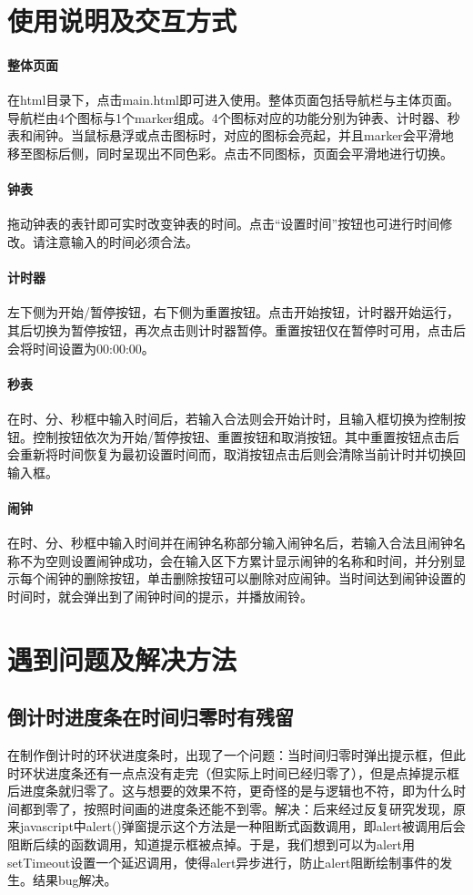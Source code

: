 \documentclass[UTF8]{ctexart}
\begin{document}
	
	\section{使用说明及交互方式} %
	\paragraph{整体页面}
	在html目录下，点击main.html即可进入使用。整体页面包括导航栏与主体页面。导航栏由4个图标与1个marker组成。4个图标对应的功能分别为钟表、计时器、秒表和闹钟。当鼠标悬浮或点击图标时，对应的图标会亮起，并且marker会平滑地移至图标后侧，同时呈现出不同色彩。点击不同图标，页面会平滑地进行切换。
	\paragraph{钟表}
	拖动钟表的表针即可实时改变钟表的时间。点击“设置时间”按钮也可进行时间修改。请注意输入的时间必须合法。
	\paragraph{计时器}
	左下侧为开始/暂停按钮，右下侧为重置按钮。点击开始按钮，计时器开始运行，其后切换为暂停按钮，再次点击则计时器暂停。重置按钮仅在暂停时可用，点击后会将时间设置为00:00:00。
	\paragraph{秒表}
	在时、分、秒框中输入时间后，若输入合法则会开始计时，且输入框切换为控制按钮。控制按钮依次为开始/暂停按钮、重置按钮和取消按钮。其中重置按钮点击后会重新将时间恢复为最初设置时间而，取消按钮点击后则会清除当前计时并切换回输入框。
	\paragraph{闹钟}
	在时、分、秒框中输入时间并在闹钟名称部分输入闹钟名后，若输入合法且闹钟名称不为空则设置闹钟成功，会在输入区下方累计显示闹钟的名称和时间，并分别显示每个闹钟的删除按钮，单击删除按钮可以删除对应闹钟。当时间达到闹钟设置的时间时，就会弹出到了闹钟时间的提示，并播放闹铃。
	

	\section{遇到问题及解决方法}%
	\subsection{倒计时进度条在时间归零时有残留}
	在制作倒计时的环状进度条时，出现了一个问题：当时间归零时弹出提示框，但此时环状进度条还有一点点没有走完（但实际上时间已经归零了），但是点掉提示框后进度条就归零了。这与想要的效果不符，更奇怪的是与逻辑也不符，即为什么时间都到零了，按照时间画的进度条还能不到零。解决：后来经过反复研究发现，原来javascript中alert()弹窗提示这个方法是一种阻断式函数调用，即alert被调用后会阻断后续的函数调用，知道提示框被点掉。于是，我们想到可以为alert用setTimeout设置一个延迟调用，使得alert异步进行，防止alert阻断绘制事件的发生。结果bug解决。
	
\end{document}
